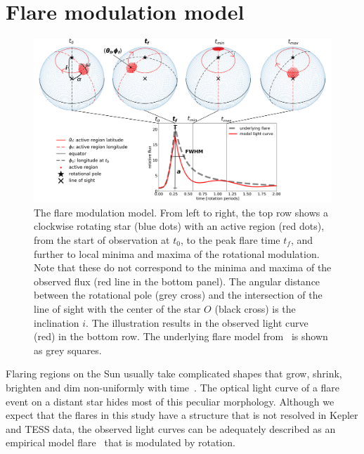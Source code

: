 \documentclass[fleqn,usenatbib,letters]{mnras}%
\begin{document}
\section{Flare modulation model}
\label{sec:model}
\begin{figure}
	\includegraphics[width=17cm]{figures/model_illustration_annot2.png}
    \caption{The flare modulation model. From left to right, the top row shows a clockwise rotating star (blue dots) with an active region (red dots), from the start of observation at $t_0$, to the peak flare time $t_f$, and further to local minima and maxima of the rotational modulation. Note that these do not correspond to the minima and maxima of the observed flux (red line in the bottom panel). The angular distance between the rotational pole (grey cross) and the intersection of the line of sight with the center of the star $O$ (black cross) is the inclination $i$. The illustration results in the observed light curve (red) in the bottom row. The underlying flare model from~\citet{davenport2014} is shown as grey squares.}
    \label{fig:model}
\end{figure}
Flaring regions on the Sun usually take complicated shapes that grow, shrink, brighten and dim non-uniformly with time~\citep{aschwanden2008}. The optical light curve of a flare event on a distant star hides most of this peculiar morphology. Although we expect that the flares in this study have a structure that is not resolved in Kepler and TESS data, the observed light curves can be adequately described as an empirical model flare~\citep{davenport2014} that is modulated by rotation.
\\
\end{document}
